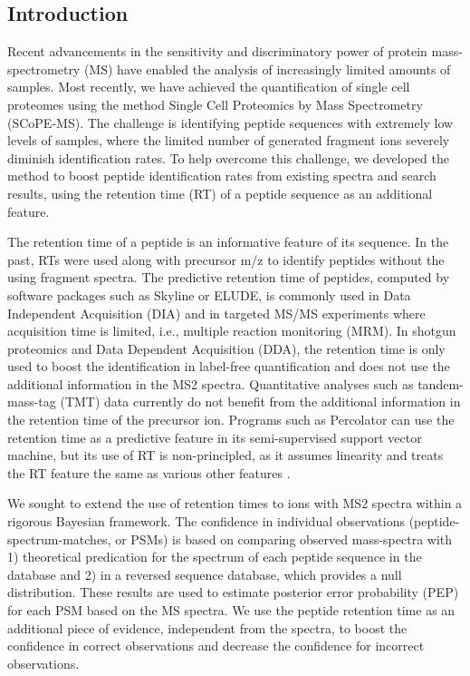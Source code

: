 \begin{spacing}{1.55} 
\thispagestyle{empty}
\vspace{1cm}

\newpage


\section{Introduction}

Recent advancements in the sensitivity and discriminatory power of protein mass-spectrometry (MS) have enabled the analysis of increasingly limited amounts of samples. Most recently, we have achieved the quantification of single cell proteomes using the method Single Cell Proteomics by Mass Spectrometry (SCoPE-MS). The challenge is identifying peptide sequences with extremely low levels of samples, where the limited number of generated fragment ions severely diminish identification rates. To help overcome this challenge, we developed the \methodname\;method to boost peptide identification rates from existing spectra and search results, using the retention time (RT) of a peptide sequence as an additional feature.

The retention time of a peptide is an informative feature of its sequence. In the past, RTs were used along with precursor m/z to identify peptides without the using fragment spectra. The predictive retention time of peptides, computed by software packages such as Skyline or ELUDE, is commonly used in Data Independent Acquisition (DIA) and in targeted MS/MS experiments where acquisition time is limited, i.e., multiple reaction monitoring (MRM). In shotgun proteomics and Data Dependent Acquisition (DDA), the retention time is only used to boost the identification in label-free quantification and does not use the additional information in the MS2 spectra. Quantitative analyses such as tandem-mass-tag (TMT) data currently do not benefit from the additional information in the retention time of the precursor ion. Programs such as Percolator can use the retention time as a predictive feature in its semi-supervised support vector machine, but its use of RT is non-principled, as it assumes linearity and treats the RT feature the same as various other features \citep{kall2007percolator}.

We sought to extend the use of retention times to ions with MS2 spectra within a rigorous Bayesian framework. The confidence in individual observations (peptide-spectrum-matches, or PSMs) is based on comparing observed mass-spectra with 1) theoretical predication for the spectrum of each peptide sequence in the database and 2) in a reversed sequence database, which provides a null distribution. These results are used to estimate posterior error probability (PEP) for each PSM based on the MS spectra. We use the peptide retention time as an additional piece of evidence, independent from the spectra, to boost the confidence in correct observations and decrease the confidence for incorrect observations. 



\end{spacing}
